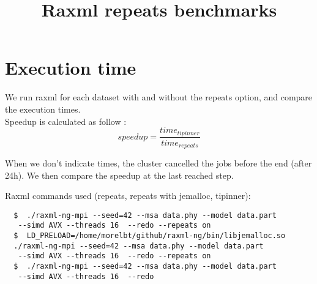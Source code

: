 \documentclass[a4paper]{article}
\begin{document}
\newcommand*{\figuretitle}[1]{%
    {\centering%
    \textbf{#1}%
    \par\medskip}%
}


\title{Raxml repeats benchmarks}
\maketitle


\section{Execution time}

\noindent We run raxml for each dataset with and without the repeats option, and compare the execution times.\\


\noindent Speedup is calculated as follow :  
$$ speedup = \frac{time_{tipinner}}{time_{repeats}}$$

When we don't indicate times, the cluster cancelled the jobs before the end (after 24h). We then compare the speedup at the last reached step. \newline

Raxml commands used (repeats, repeats with jemalloc, tipinner):
\lstset{language=sh}
\begin{lstlisting}
  $  ./raxml-ng-mpi --seed=42 --msa data.phy --model data.part
   --simd AVX --threads 16  --redo --repeats on
  $  LD_PRELOAD=/home/morelbt/github/raxml-ng/bin/libjemalloc.so
  ./raxml-ng-mpi --seed=42 --msa data.phy --model data.part
   --simd AVX --threads 16  --redo --repeats on
  $  ./raxml-ng-mpi --seed=42 --msa data.phy --model data.part
   --simd AVX --threads 16  --redo
\end{lstlisting}
\end{document}
